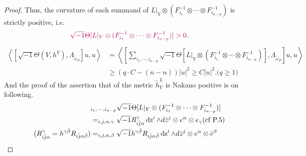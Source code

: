 \documentclass[lang=en,12pt]{beautybook}
\begin{document}
\begin{proof}
  Thus, the curvature of each summand of $L |_Y \otimes  (F_{i_1}^{-
      1} \otimes \cdots \otimes F_{i_{n - p}}^{- 1})$ is strictly positive, i.e.
  \[{\color[HTML]{B4005A}\sqrt{- 1} \Theta [L |_Y \otimes (F_{i_1}^{- 1} \otimes \cdots \otimes F_{i_{n - p}}^{- 1})]> 0}.
  \]
  \begin{align*}
    \left\langle \left[ \sqrt{- 1} \Theta (V, h^V), \Lambda_{\widetilde{\omega}_P}\right] u, u \right\rangle & =  \left\langle \left[ \sum_{i_1, \cdots, i_{n - p}}\sqrt{- 1} \Theta [L |_Y \otimes  (F_{i_1}^{- 1} \otimes \cdots\otimes F_{i_{n - p}}^{- 1})], \Lambda_{\widetilde{\omega}_P} \right] u, u\right\rangle \\
                                                                                                             & \geqslant (q\cdot C-(n-n))|u|^2\geqslant C|u|^2. \text{($q\geqslant 1$)}
  \end{align*}
  \clearpage
  And the proof of the assertion that of the metric $\widetilde{h}^{L }_Y$ is Nakano
  positive is on following.
  \begin{align*}
                                                                                              & \sum_{i_1, \cdots, i_{n - p}} \sqrt{- 1} \Theta [L |_Y \otimes
    (F_{i_1}^{- 1} \otimes \cdots \otimes F_{i_{n - p}}^{- 1})]                                                                                                                                                                                                                                                                                                                  \\
                                                                                              & =  \sum_{i,j, \alpha, \gamma} \sqrt{- 1} R_{i \bar{j} \alpha}^{\gamma} \tmop{dz}^i
    \wedge d \bar{z}^j \otimes e^{\alpha} \otimes e_{\gamma}  (\textrm{cf P.5} )                                                                                                                                                                                                                                                                                                 \\
    (R_{i \bar{j} \alpha}^{\gamma} = h^{\gamma \bar{\beta}} R_{i \bar{j} \alpha\bar{\beta}} ) & =  \sum_{i, j, \alpha, \beta} \sqrt{- 1} h^{\gamma
    \bar{\beta}} R_{i \bar{j} \alpha \bar{\beta}}  \tmop{dz}^i \wedge d\bar{z}^j \otimes e^{\alpha} \otimes \bar{e}^{\beta}                                                                                                                                                                                                                                                      \\

\end{align*}
\end{proof}
\end{document}
